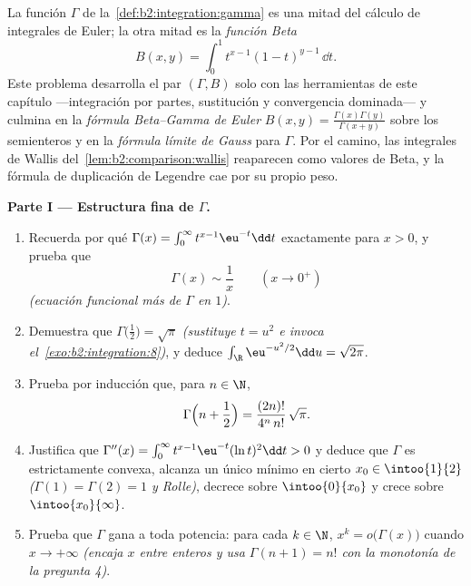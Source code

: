 \begin{problem}\label{pb:b2:integration:1}
La función $\Gamma$ de la~\cref{def:b2:integration:gamma} es una
mitad del cálculo de integrales de Euler; la otra mitad es la
\emph{función Beta}
\[
B(x, y) = \int_0^1 t^{x-1}(1 - t)^{y-1}\,\dd t .
\]
Este problema desarrolla el par $(\Gamma, B)$ solo con las
herramientas de este capítulo ---integración por partes,
sustitución y convergencia dominada--- y culmina en la
\emph{fórmula Beta--Gamma de Euler} $B(x,y) =
\frac{\Gamma(x)\Gamma(y)} {\Gamma(x+y)}$ sobre los semienteros y en
la \emph{fórmula límite de Gauss}
para $\Gamma$. Por el camino, las integrales de Wallis del~\cref{lem:b2:comparison:wallis} reaparecen como valores de Beta, y
la fórmula de duplicación de Legendre cae por su propio peso.

\medskip
\noindent\textbf{Parte I --- Estructura fina de $\Gamma$.}
\begin{enumerate}
  \item Recuerda por qué $\Gamma(x) = \int_0^\infty
        t^{x-1}\eu^{-t}\dd t$  exactamente para $x > 0$, y
        prueba que
        \[
        \Gamma(x) \sim \frac1x \qquad (x \to 0^+)
        \]
        \emph{(ecuación funcional más  de $\Gamma$ en
        $1$)}.
  \item Demuestra que $\Gamma\bigl(\tfrac12\bigr) = \sqrt\pi$
        \emph{(sustituye $t = u^2$ e invoca el~\cref{exo:b2:integration:8})}, y deduce $\int_\R
        \eu^{-u^2/2}\dd u = \sqrt{2\pi}$.
  \item Prueba por inducción que, para $n \in \N$,
        \[
        \Gamma\Bigl(n + \frac12\Bigr)
        = \frac{(2n)!}{4^n\,n!}\,\sqrt\pi .
        \]
  \item Justifica que $\Gamma''(x) = \int_0^\infty
        t^{x-1}\eu^{-t}(\ln t)^2\dd t > 0$ y deduce que $\Gamma$ es
        estrictamente convexa, alcanza un único mínimo en cierto
        $x_0 \in \intoo{1}{2}$ \emph{($\Gamma(1) = \Gamma(2) = 1$ y
        Rolle)}, decrece sobre $\intoo{0}{x_0}$ y crece sobre
        $\intoo{x_0}{\infty}$.
  \item Prueba que $\Gamma$ gana a toda potencia: para cada $k \in
        \N$, $x^k = o\bigl(\Gamma(x)\bigr)$ cuando $x \to +\infty$
        \emph{(encaja $x$ entre enteros y usa $\Gamma(n+1) = n!$ con
        la monotonía de la pregunta 4)}.
\end{enumerate}


\end{problem}

